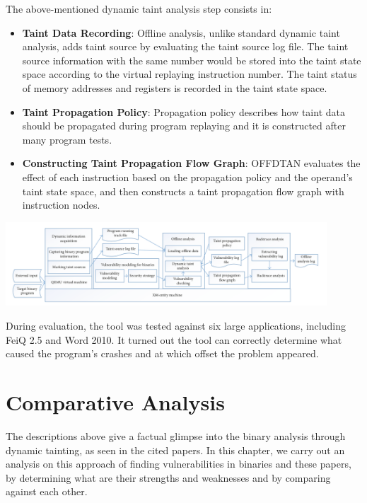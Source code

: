 \documentclass[10pt,a4paper,english,onecolumn]{IEEEtran}
\begin{document}
The above-mentioned dynamic taint analysis step consists in:

\begin{itemize}
    \item \textbf{Taint Data Recording}: Offline analysis, unlike standard dynamic taint analysis, adds taint source by evaluating the taint source log file. The taint source information with the same number would be stored into the taint state space according to the virtual replaying instruction number. The taint status of memory addresses and registers is recorded in the taint state space.
    \item \textbf{Taint Propagation Policy}: Propagation policy describes how taint data should be propagated during program replaying and it is constructed after many program tests.
    \item \textbf{Constructing Taint Propagation Flow Graph}: OFFDTAN evaluates the effect of each instruction based on the propagation policy and the operand's taint state space, and then constructs a taint propagation flow graph with instruction nodes.
\end{itemize}

\begin{center}
    \includegraphics[width=12cm]{images/offdtan.png}
    \vspace{0.5cm}
\end{center}

During evaluation, the tool was tested against six large applications, including FeiQ 2.5 and Word 2010. It turned out the tool can correctly determine what caused the program's crashes and at which offset the problem appeared.

\section{Comparative Analysis}

The descriptions above give a factual glimpse into the binary analysis through dynamic tainting, as seen in the cited papers. In this chapter, we carry out an analysis on this approach of finding vulnerabilities in binaries and these papers, by determining what are their strengths and weaknesses and by comparing against each other.
\end{document}
